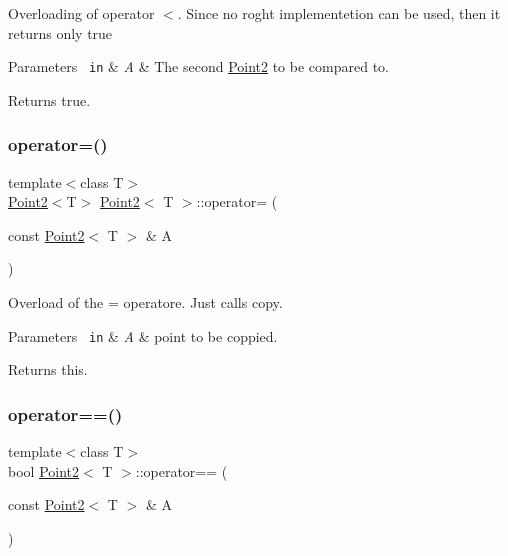 Overloading of operator $<$. Since no roght implementetion can be used, then it returns only {\ttfamily true} 


\begin{DoxyParams}[1]{Parameters}
\mbox{\texttt{ in}}  & {\em A} & The second {\ttfamily \mbox{\hyperlink{class_point2}{Point2}}} to be compared to.\\
\hline
\end{DoxyParams}
\begin{DoxyReturn}{Returns}
{\ttfamily true}. 
\end{DoxyReturn}
\mbox{\label{class_point2_af715722f2b04def60eb23f291e31c4d8}} 
\subsubsection{\texorpdfstring{operator=()}{operator=()}}
{\footnotesize\ttfamily template$<$class T$>$ \\
\mbox{\hyperlink{class_point2}{Point2}}$<$T$>$ \mbox{\hyperlink{class_point2}{Point2}}$<$ T $>$\+::operator= (\begin{DoxyParamCaption}\item[{const \mbox{\hyperlink{class_point2}{Point2}}$<$ T $>$ \&}]{A }\end{DoxyParamCaption})\hspace{0.3cm}{\ttfamily [inline]}}



Overload of the = operatore. Just calls {\ttfamily copy}. 


\begin{DoxyParams}[1]{Parameters}
\mbox{\texttt{ in}}  & {\em A} & point to be coppied. \\
\hline
\end{DoxyParams}
\begin{DoxyReturn}{Returns}
this. 
\end{DoxyReturn}
\mbox{\label{class_point2_af58b2b05b59316580b3989b0548afade}} 
\subsubsection{\texorpdfstring{operator==()}{operator==()}}
{\footnotesize\ttfamily template$<$class T$>$ \\
bool \mbox{\hyperlink{class_point2}{Point2}}$<$ T $>$\+::operator== (\begin{DoxyParamCaption}\item[{const \mbox{\hyperlink{class_point2}{Point2}}$<$ T $>$ \&}]{A }\end{DoxyParamCaption})\hspace{0.3cm}{\ttfamily [inline]}}



